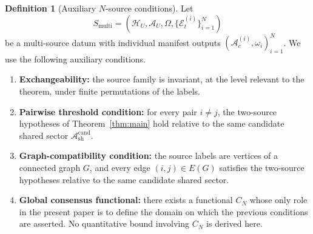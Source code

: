 \documentclass[12pt]{article}
\theoremstyle{definition}
\newtheorem{definition}[theorem]{Definition}
\theoremstyle{remark}
\begin{document}
\begin{definition}[Auxiliary \(N\)-source conditions]
\label{def:Nconds}
Let
\[
S_{\mathrm{multi}}
=
(\mathcal H_U,\mathcal A_U,\Omega,\{\mathcal E_t^{(i)}\}_{i=1}^N)
\]
be a multi-source datum with individual manifest outputs
\((\mathcal A_c^{(i)},\omega_i)_{i=1}^N\). We use the following
auxiliary conditions.
\begin{enumerate}
\item \textbf{Exchangeability:} the source family is invariant, at the
  level relevant to the theorem, under finite permutations of the
  labels.
\item \textbf{Pairwise threshold condition:} for every pair
  \(i\neq j\), the two-source hypotheses of
  Theorem~\ref{thm:main} hold relative to the same candidate shared
  sector \(\mathcal A_{\mathrm{sh}}^{\mathrm{cand}}\).
\item \textbf{Graph-compatibility condition:} the source labels are
  vertices of a connected graph \(G\), and every edge
  \((i,j)\in E(G)\) satisfies the two-source hypotheses relative to the
  same candidate shared sector.
\item \textbf{Global consensus functional:} there exists a functional
  \(C_N\) whose only role in the present paper is to define the domain
  on which the previous conditions are asserted. No quantitative bound
  involving \(C_N\) is derived here.
\end{enumerate}
\end{definition}
\end{document}
